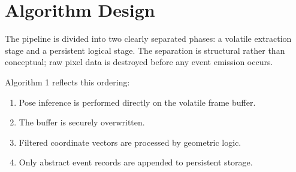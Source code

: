 \documentclass[conference]{IEEEtran}
\begin{document}
\section{Algorithm Design}

The pipeline is divided into two clearly separated phases: a volatile extraction stage and a persistent logical stage. The separation is structural rather than conceptual; raw pixel data is destroyed before any event emission occurs.

Algorithm 1 reflects this ordering:
\begin{enumerate}
    \item Pose inference is performed directly on the volatile frame buffer.
    \item The buffer is securely overwritten.
    \item Filtered coordinate vectors are processed by geometric logic.
    \item Only abstract event records are appended to persistent storage.
\end{enumerate}
\end{document}
